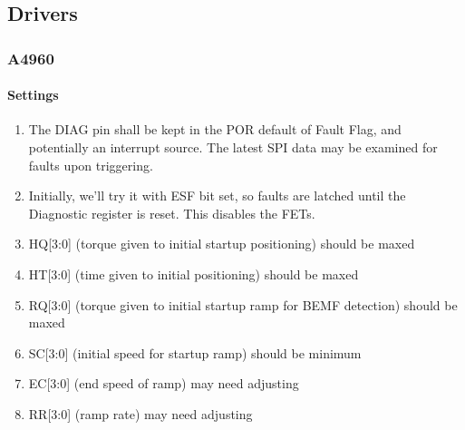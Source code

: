 \documentclass{scrreprt}
\begin{document}
	\subsection{Drivers}
	\subsubsection{A4960}
	\paragraph{Settings}
	\begin{enumerate}
		\item The DIAG pin shall be kept in the POR default of Fault Flag, and potentially an interrupt source.  The latest SPI data may be examined for faults upon triggering.
		\item Initially, we'll try it with ESF bit set, so faults are latched until the Diagnostic register is reset.  This disables the FETs.
		\item HQ[3:0] (torque given to initial startup positioning) should be maxed
		\item HT[3:0] (time given to initial positioning) should be maxed
		\item RQ[3:0] (torque given to initial startup ramp for BEMF detection) should be maxed
		\item SC[3:0] (initial speed for startup ramp) should be minimum
		\item EC[3:0] (end speed of ramp) may need adjusting
		\item RR[3:0] (ramp rate) may need adjusting
	\end{enumerate}
\end{document}
